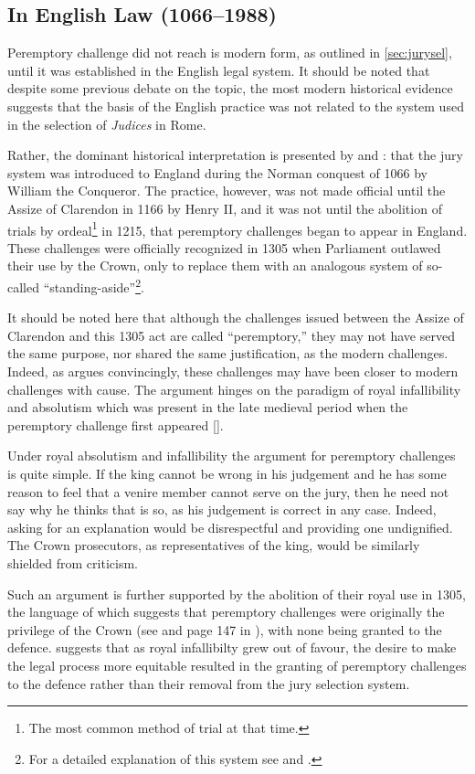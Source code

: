 \subsection{In English Law (1066--1988)}

Peremptory challenge did not reach is modern form, as outlined in \ref{sec:jurysel}, until it was established in the English legal
system. It should be noted that despite some previous debate on the topic, the most modern historical evidence suggests that the
basis of the English practice was not related to the system used in the selection of \textit{Judices} in Rome.

Rather, the dominant historical interpretation is presented by \cite{vonmosch1921} and \cite{hoffman1997}: that the jury system
was introduced to England during the Norman conquest of 1066 by William the Conqueror. The practice, however, was not made
official until the Assize of Clarendon in 1166 by Henry II, and it was not until the abolition of trials by ordeal\footnote{The
  most common method of trial at that time.} in 1215, that peremptory challenges began to appear in England. These challenges
were officially recognized in 1305 when Parliament outlawed their use by the Crown, only to replace them with an analogous system
of so-called ``standing-aside''\footnote{For a detailed explanation of this system see \cite{hoffman1997} and \cite{brown2000}.}.

It should be noted here that although the challenges issued between the Assize of Clarendon and this 1305 act are called
``peremptory,'' they may not have served the same purpose, nor shared the same justification, as the modern challenges. Indeed, as
\cite{hoffman1997} argues convincingly, these challenges may have been closer to modern challenges with cause. The argument hinges 
on the paradigm of royal infallibility and absolutism which was present in the late medieval period when the peremptory challenge
first appeared [\cite{burgess1992}].

Under royal absolutism and infallibility the argument for peremptory challenges is quite simple. If the king cannot be wrong in
his judgement and he has some reason to feel that a venire member cannot serve on the jury, then he need not say why he thinks
that is so, as his judgement is correct in any case. Indeed, asking for an explanation would be disrespectful and providing one
undignified. The Crown prosecutors, as representatives of the king, would be similarly shielded from criticism.

Such an argument is further supported by the abolition of their royal use in 1305, the language of which suggests that peremptory
challenges were originally the privilege of the Crown (see \cite{hoffman1997} and page 147 in \cite{vandykejurysel}), with none
being granted to the defence. \cite{hoffman1997} suggests that as royal infallibilty grew out of favour, the desire to make the
legal process more equitable resulted in the granting of peremptory challenges to the defence rather than their removal from the
jury selection system.

